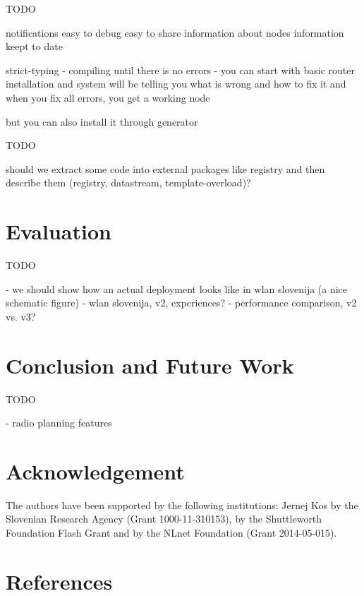 \documentclass[5p,sort&compress]{elsarticle}
\begin{document}
TODO

notifications
easy to debug
easy to share information about nodes
information keept to date

strict-typing - compiling until there is no errors - you can start with basic router installation and system will be telling you what is wrong and how to fix it and when you fix all errors, you get a working node

but you can also install it through generator

TODO

should we extract some code into external packages like registry and then describe them (registry, datastream, template-overload)?

\section{Evaluation}
\label{sec:evaluation}

TODO

- we should show how an actual deployment looks like in wlan slovenija (a nice schematic figure)
- wlan slovenija, v2, experiences?
- performance comparison, v2 vs. v3?

\section{Conclusion and Future Work}
\label{sec:conclusion}

TODO

- radio planning features

\section*{Acknowledgement}

The authors have been supported by the following institutions: Jernej Kos by the Slovenian Research Agency (Grant 1000-11-310153), by the Shuttleworth Foundation Flash Grant and by the NLnet Foundation (Grant 2014-05-015).

\section*{References}

\end{document}
